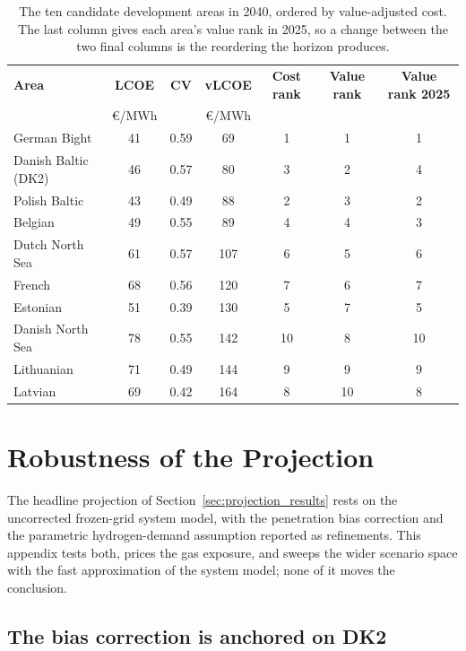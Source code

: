 \begin{table}[!htb]
\centering\small
\caption{The ten candidate development areas in 2040, ordered by
value-adjusted cost. The last column gives each area's value rank in 2025,
so a change between the two final columns is the reordering the horizon
produces.}
\label{tab:site_table}
\begin{tabular}{l c c c c c c}
\toprule
\textbf{Area} & \textbf{LCOE} & \textbf{CV} & \textbf{vLCOE} &
\textbf{Cost rank} & \textbf{Value rank} & \textbf{Value rank 2025} \\
& \euro/MWh & & \euro/MWh & & & \\
\midrule
German Bight        & 41 & 0.59 & 69  & 1  & 1  & 1 \\
Danish Baltic (DK2) & 46 & 0.57 & 80  & 3  & 2  & 4 \\
Polish Baltic       & 43 & 0.49 & 88  & 2  & 3  & 2 \\
Belgian             & 49 & 0.55 & 89  & 4  & 4  & 3 \\
Dutch North Sea     & 61 & 0.57 & 107 & 6  & 5  & 6 \\
French              & 68 & 0.56 & 120 & 7  & 6  & 7 \\
Estonian            & 51 & 0.39 & 130 & 5  & 7  & 5 \\
Danish North Sea    & 78 & 0.55 & 142 & 10 & 8  & 10 \\
Lithuanian          & 71 & 0.49 & 144 & 9  & 9  & 9 \\
Latvian             & 69 & 0.42 & 164 & 8  & 10 & 8 \\
\bottomrule
\end{tabular}
\end{table}

\section{Robustness of the Projection}\label{app:robustness}

The headline projection of Section~\ref{sec:projection_results} rests on the uncorrected
frozen-grid system model, with the penetration bias correction and the
parametric hydrogen-demand assumption reported as refinements. This appendix tests both, prices the
gas exposure, and sweeps the wider scenario space with the fast approximation of the system
model; none of
it moves the conclusion.

\subsection*{The bias correction is anchored on DK2}

